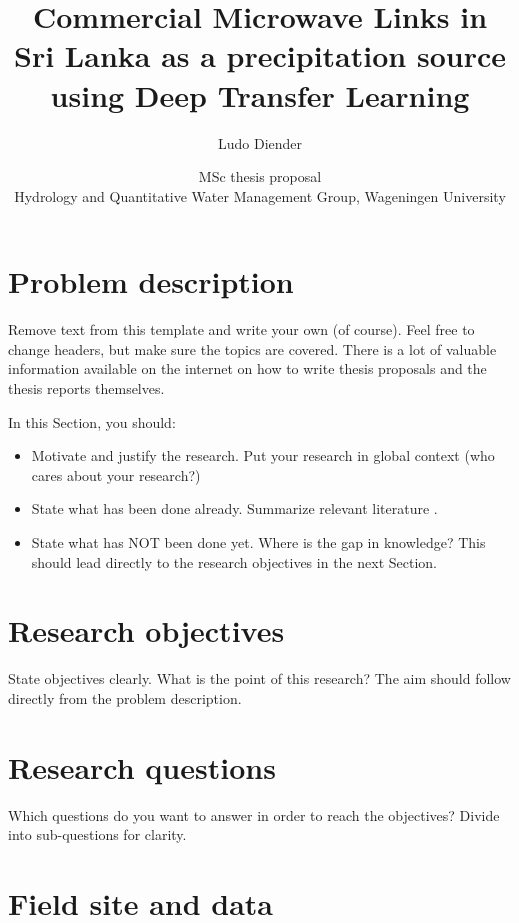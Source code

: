 \documentclass[twocolumn, 10pt, a4paper]{article}
\begin{document}
	
	\title{\vspace{-1cm}\Huge{Commercial Microwave Links in Sri Lanka as a precipitation source using Deep Transfer Learning}}
	\author{\Large{Ludo Diender}}
	\date{\normalsize{MSc thesis proposal\\
			Hydrology and Quantitative Water Management Group,
			Wageningen University}}
	
	\maketitle
	
	\section{Problem description}
	
	Remove text from this template and write your own (of course). Feel free to change headers, but make sure the topics are covered. There is a lot of valuable information available on the internet on how to write thesis proposals and the thesis reports themselves. 
	
	In this Section, you should:
	\begin{itemize}
		\item Motivate and justify the research. Put your research in global context (who cares about your research?)
		\item State what has been done already. Summarize relevant literature \citep{Brauer2011}.
		\item State what has NOT been done yet. Where is the gap in knowledge? This should lead directly to the research objectives in the next Section.
	\end{itemize}
	
	\section{Research objectives}
	
	State objectives clearly. What is the point of this research? The aim should follow directly from the problem description. 
	
	\section{Research questions}
	
	Which questions do you want to answer in order to reach the objectives? Divide into sub-questions for clarity.
	
	
	\section{Field site and data}
	
\end{document}
